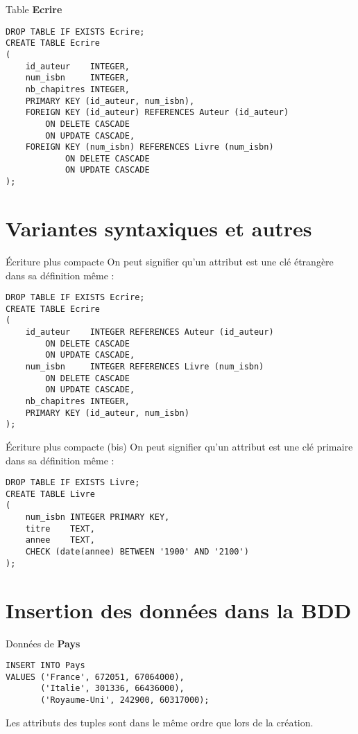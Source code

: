 \documentclass[10pt]{nsibeamer}
\begin{document}
\begin{frame}[fragile]{Table \textbf{Ecrire}}
    \begin{verbatim}
DROP TABLE IF EXISTS Ecrire;
CREATE TABLE Ecrire
(
    id_auteur    INTEGER,
    num_isbn     INTEGER,
    nb_chapitres INTEGER,
    PRIMARY KEY (id_auteur, num_isbn),
    FOREIGN KEY (id_auteur) REFERENCES Auteur (id_auteur)
        ON DELETE CASCADE
        ON UPDATE CASCADE,
    FOREIGN KEY (num_isbn) REFERENCES Livre (num_isbn)
            ON DELETE CASCADE
            ON UPDATE CASCADE
);
\end{verbatim}
\end{frame}
\section{Variantes syntaxiques et autres}
\begin{frame}[fragile]{\'Ecriture plus compacte}
    On peut signifier qu'un attribut est une clé étrangère dans sa définition même :\pause
    \begin{verbatim}
DROP TABLE IF EXISTS Ecrire;
CREATE TABLE Ecrire
(
    id_auteur    INTEGER REFERENCES Auteur (id_auteur)
        ON DELETE CASCADE
        ON UPDATE CASCADE,
    num_isbn     INTEGER REFERENCES Livre (num_isbn)
        ON DELETE CASCADE
        ON UPDATE CASCADE,
    nb_chapitres INTEGER,
    PRIMARY KEY (id_auteur, num_isbn)
);
\end{verbatim}
\end{frame}

\begin{frame}[fragile]{\'Ecriture plus compacte (bis)}
    On peut signifier qu'un attribut est une clé primaire dans sa définition même :\pause
    \begin{verbatim}
DROP TABLE IF EXISTS Livre;
CREATE TABLE Livre
(
    num_isbn INTEGER PRIMARY KEY,
    titre    TEXT,
    annee    TEXT,
    CHECK (date(annee) BETWEEN '1900' AND '2100')
);
\end{verbatim}
\end{frame}


\section{Insertion des données dans la BDD}


\begin{frame}[fragile]{Données de \textbf{Pays}}
    \begin{verbatim}
INSERT INTO Pays
VALUES ('France', 672051, 67064000),
       ('Italie', 301336, 66436000),
       ('Royaume-Uni', 242900, 60317000);
\end{verbatim}
    Les attributs des tuples sont dans le même ordre que lors de la création.
\end{frame}
\end{document}
